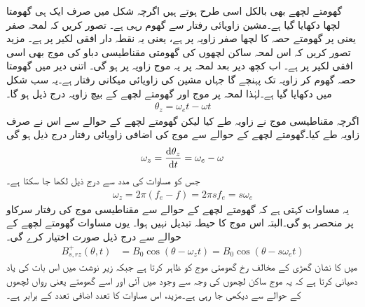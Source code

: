 گھومتے لچھے بھی بالکل اسی طرح ہوتے ہیں اگرچہ شکل  میں صرف ایک ہی گھومتا لچھا دکھایا گیا ہے۔مشین  زاویائی رفتار سے گھوم رہی ہے۔ تصور کریں کہ لمحہ صفر یعنی  پر گھومتے حصہ کا   لچھا صفر زاویہ پر ہے، یعنی یہ نقطہ دار افقی لکیر پر ہے۔ مزید تصور کریں کہ اس لمحہ ساکن لچھوں کی گھومتی مقناطیسی دباو کی موج بھی اسی افقی لکیر پر ہے۔ اب کچھ دیر بعد لمحہ  پر یہ موج زاویہ   پر ہو گی۔ اتنی دیر میں گھومتا حصہ گھوم کر زاویہ   تک پہنچے گا جہاں   مشین کی زاویائی میکانی رفتار ہے۔یہ سب شکل  میں دکھایا گیا ہے۔لہٰذا لمحہ  پر موج اور گھومتے لچھے کے بیچ زاویہ  درج ذیل ہو گا۔
\begin{align}
\theta_z=\omega_e t -\omega t
\end{align}
اگرچہ مقناطیسی موج نے  زاویہ طے کیا لیکن گھومتے لچھے کے حوالے سے اس نے صرف  زاویہ  طے کیا۔گھومتے لچھے کے حوالے سے  موج کی  اضافی زاویائی رفتار  درج ذیل ہو گی
\begin{align}
\omega_z=\frac{\dif \theta_z}{\dif t}=\omega_e -\omega
\end{align}
جس کو مساوات  کی مدد سے درج ذیل لکھا جا سکتا ہے۔
\begin{align}
\omega_z=2 \pi (f_e-f)=2 \pi s f_e = s \omega_e
\end{align}
یہ مساوات کہتی ہے کہ گھومتے لچھے کے حوالے سے مقناطیسی موج کی رفتار سرکاو  پر منحصر ہو گی۔البتہ اس موج کا حیطہ  تبدیل نہیں ہوا۔ یوں مساوات   گھومتے لچھے کے حوالے سے درج ذیل صورت اختیار کرے گی۔
\begin{align}
B_{s,rz}^+(\theta,t)&=B_0 \cos (\theta-\omega_z t)=B_0 \cos (\theta -s \omega_e t)
\end{align}
 میں  کا نشان  گھڑی کے مخالف رخ گھومتی موج کو ظاہر کرتا ہے جبکہ  زیر نوشت میں    اس بات کی یاد دھیانی کرتا ہے کہ یہ موج ساکن لچھوں کی وجہ سے وجود میں آئی  اور اسے گھومتے یعنی رواں لچھوں کے حوالے سے دیکھی جا رہی ہے۔مزید، اس مساوات کا تعدد اضافی تعدد  کے برابر ہے۔

